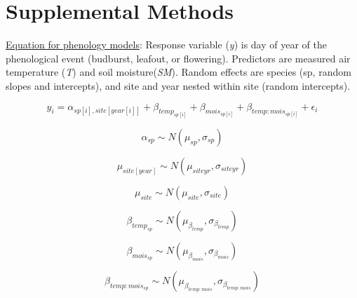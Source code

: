 \documentclass{article}
\begin{document}
\begin{singlespace}
\end{singlespace}


\clearpage

\section* {Supplemental Methods}
\underline{Equation for phenology models}: 
Response variable (\textit{y}) is day of year of the phenological event (budburst, leafout, or flowering). Predictors are measured air temperature (\textit{T}) and soil moisture(\textit{SM}). Random effects are species (sp, random slopes and intercepts), and  site and year nested within site (random intercepts).

\begin{equation}
y_{i}=\alpha_{sp[i],site[year[i]]} + \beta_{temp_{sp[i]}}+ \beta_{mois_{sp[i]}} + \beta_{temp:mois_{sp[i]}}+\epsilon_{i}\label{eq:8}
\end{equation}

\begin{equation}
\alpha_{sp}\sim N(\mu_{sp}, \sigma_{sp})
\end{equation}

\begin{equation}
\mu_{site[year]} \sim N(\mu_{siteyr}, \sigma_{siteyr})
\end{equation}

\begin{equation}
\mu_{site} \sim N(\mu_{site}, \sigma_{site})
\end{equation}

\begin{equation}
\beta_{temp_{sp}} \sim N(\mu_{\beta_{temp}}, \sigma_{\beta_{temp}})
\end{equation}

\begin{equation}
\beta_{mois_{sp}} \sim N(\mu_{\beta_{mois}}, \sigma_{\beta_{mois}})
\end{equation}

\begin{equation}
\beta_{temp:mois_{sp}} \sim N(\mu_{\beta_{temp:mois}}, \sigma_{\beta_{temp:mois}})
\end{equation}
\end{document}
